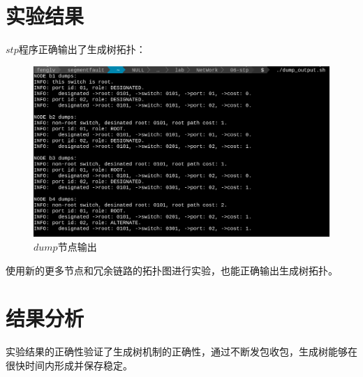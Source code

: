 \documentclass[UTF8,noindent]{ctexart}
\begin{document}
\section*{{实验结果}}
$stp$程序正确输出了生成树拓扑：
\begin{figure}[H]
  \centering
  \includegraphics[scale=0.3]{./dump4.png}
  \caption{$dump$节点输出}
\end{figure}

使用新的更多节点和冗余链路的拓扑图进行实验，也能正确输出生成树拓扑。

\section*{{结果分析}}
实验结果的正确性验证了生成树机制的正确性，通过不断发包收包，生成树能够在很快时间内形成并保存稳定。
\end{document}
